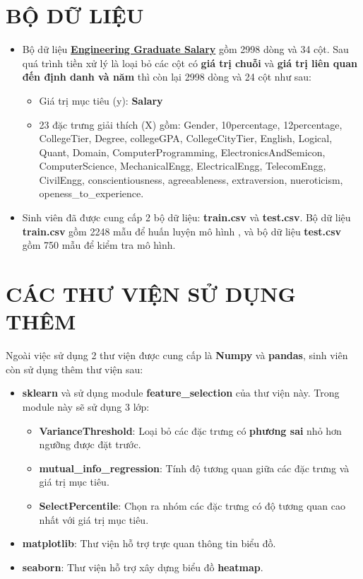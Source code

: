 \documentclass{report}
\begin{document}
\section{BỘ DỮ LIỆU}
\begin{itemize}
    \item  Bộ dữ liệu \textbf{\href{https://www.kaggle.com/datasets/manishkc06/engineering-graduate-salary-prediction}{Engineering Graduate Salary}} gồm 2998 dòng và 34 cột. Sau quá trình tiền xử lý là loại bỏ các cột có \textbf{giá trị chuỗi} và \textbf{giá trị liên quan đến định danh và năm} thì còn lại 2998 dòng và 24 cột như sau:
    \begin{itemize}
        \item Giá trị mục tiêu (y): \textbf{Salary}
        \item 23 đặc trưng giải thích (X) gồm: Gender, 10percentage, 12percentage, CollegeTier, Degree, collegeGPA, CollegeCityTier, English, Logical, Quant, Domain, ComputerProgramming, ElectronicsAndSemicon, ComputerScience, MechanicalEngg, ElectricalEngg, TelecomEngg, CivilEngg, conscientiousness, agreeableness, extraversion, nueroticism, openess\_to\_experience.
    \end{itemize}
    \item Sinh viên đã được cung cấp 2 bộ dữ liệu: \textbf{train.csv} và \textbf{test.csv}. Bộ dữ liệu \textbf{train.csv} gồm 2248 mẫu để huấn luyện mô hình , và bộ dữ liệu \textbf{test.csv} gồm 750 mẫu để kiểm tra mô hình.
\end{itemize}

\section{CÁC THƯ VIỆN SỬ DỤNG THÊM} \label{sec:library}
Ngoài việc sử dụng 2 thư viện được cung cấp là \textbf{Numpy} và \textbf{pandas}, sinh viên còn sử dụng thêm thư viện sau:
\begin{itemize}
    \item \textbf{sklearn} và sử dụng module \textbf{feature\_selection} của thư viện này. Trong module này sẽ sử dụng 3 lớp:
        \begin{itemize}
            \item \textbf{VarianceThreshold}: Loại bỏ các đặc trưng có \textbf{phương sai} nhỏ hơn ngưỡng được đặt trước.
            \item \textbf{mutual\_info\_regression}: Tính độ tương quan giữa các đặc trưng và giá trị mục tiêu.
            \item \textbf{SelectPercentile}: Chọn ra nhóm các đặc trưng có độ tương quan cao nhất với giá trị mục tiêu.
        \end{itemize}
    
    \item \textbf{matplotlib}: Thư viện hỗ trợ trực quan thông tin biểu đồ.
    \item \textbf{seaborn}: Thư viện hỗ trợ xây dựng biểu đồ \textbf{heatmap}.
\end{itemize}
\end{document}
